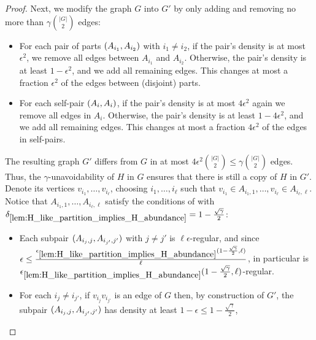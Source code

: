 \begin{theorem}
\begin{proof}
            Next, we modify the graph $G$ into $G'$ by only adding and removing no more than $\gamma {|G| \choose 2}$
            edges:
            \begin{itemize}
                \item For each pair of parts $( A_{i_1}, A_{i_2} )$ with $i_1 \neq i_2$, if the pair's density is
                    at most $\epsilon^2$, we remove all edges between $A_{i_1}$ and $A_{i_2}$.
                    Otherwise, the pair's density is at least $1 - \epsilon^2$, and we add all remaining edges.
                    This changes at most a fraction $\epsilon^2$ of the edges between (disjoint) parts.
                \item For each self-pair $( A_i, A_i )$, if the pair's density is at most $4 \epsilon^2$ again we
                    remove all edges in $A_i$.
                    Otherwise, the pair's density is at least $1 - 4 \epsilon^2$, and we add all remaining edges.
                    This changes at most a fraction $4 \epsilon^2$ of the edges in self-pairs.
            \end{itemize}
            The resulting graph $G'$ differs from $G$ in at most $4 \epsilon^2 {|G| \choose 2} \leq \gamma {|G| \choose 2}$
            edges.
            Thus, the $\gamma$-unavoidability of $H$ in $G$ ensures that there is still a copy of $H$ in $G'$.
            Denote its vertices $v_{i_1}, \dots, v_{i_\ell}$, choosing $i_1, \dots, i_\ell$ such that
            $v_{i_1} \in A_{i_1,1}, \dots, v_{i_\ell} \in A_{i_\ell, \ell}$.
            Notice that $A_{i_1,1}, \dots, A_{i_\ell, \ell}$ satisfy the conditions of 
            with $\delta_{\ref{lem:H_like_partition_implies_H_abundance}} = 1 - \frac{\sqrt{\gamma}}{2}$:
            \begin{itemize}
                \item Each subpair $( A_{i_j, j}, A_{i_{j'}, j'} )$ with $j \neq j'$ is $\ell \epsilon$-regular,
                    and since $\epsilon \leq \frac{\epsilon_{\ref{lem:H_like_partition_implies_H_abundance}} ( 1 - \frac{\sqrt{\gamma}}{2}, \ell )}{\ell}$,
                    in particular is $\epsilon_{\ref{lem:H_like_partition_implies_H_abundance}} ( 1 - \frac{\sqrt{\gamma}}{2}, \ell )$-regular.
                \item For each $i_j \neq i_{j'}$, if $v_{i_j} v_{i_{j'}}$ is an edge of $G$ then, by construction of $G'$,
                    the subpair $( A_{i_j, j}, A_{i_{j'}, j'} )$ has density at least $1 - \epsilon \leq 1 - \frac{\sqrt{\gamma}}{2}$,

\end{itemize}
\end{proof}
\end{theorem}
